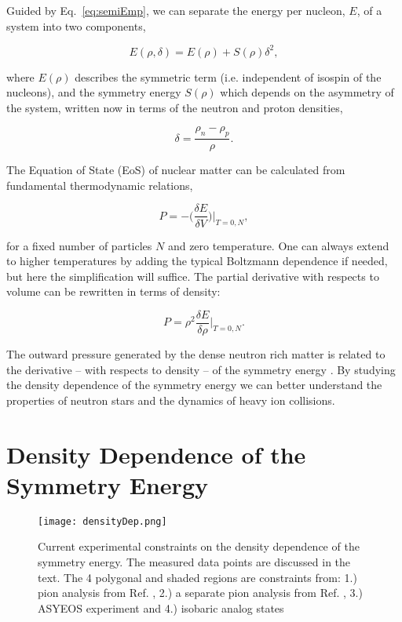 Guided by Eq.~\ref{eq:semiEmp}, we can separate the energy per nucleon, $E$, of a system into two components,

\begin{equation}
E(\rho,\delta) = E(\rho	) + S(\rho)\delta^2,
\label{eq:energyEos}
\end{equation}

where $E(\rho)$ describes the symmetric term (i.e. independent of isospin of the nucleons), and the symmetry energy $S(\rho)$ which depends on the asymmetry of the system, written now in terms of the neutron and proton densities, 

\begin{equation}
\delta = \frac{\rho_n - \rho_p}{\rho}.
\label{eq:asym}
\end{equation}

The Equation of State (EoS) of nuclear matter can be calculated from fundamental thermodynamic relations, 

\begin{equation}
P = -\Big(\frac{\delta E}{\delta V}\Big)\vert_{T=0,N} ,
\label{eq:pressEos}
\end{equation}

for a fixed number of particles $N$ and zero temperature. One can always extend to higher temperatures by adding the typical Boltzmann dependence if needed, but here the simplification will suffice. The partial derivative with respects to volume can be rewritten in terms of density:

\begin{equation}
P = \rho^2 \frac{\delta E}{\delta\rho}\vert_{T=0,N}.
\label{eq:densEos}
\end{equation}

The outward pressure generated  by the dense neutron rich matter is related to the derivative -- with respects to density  -- of the symmetry energy \cite{tovEq}. By studying the density dependence of the symmetry energy we can better understand the properties of neutron stars and the dynamics of heavy ion collisions. 

\section{Density Dependence of the Symmetry Energy}

\begin{figure}[!htb]
\centering
\texttt{[image: densityDep.png]}
\caption{Current experimental constraints on the density dependence of the symmetry energy. The measured data points are discussed in the text. The 4 polygonal and shaded regions are constraints from: 1.) pion analysis from Ref. \cite{xia2009,xie2013}, 2.) a separate pion analysis from Ref. \cite{feng2010}, 3.) ASYEOS experiment \cite{russo2011, russo2016, cozma2013} and 4.) isobaric analog states \cite{dan2014} }
\label{fig:symDen}
\end{figure}

